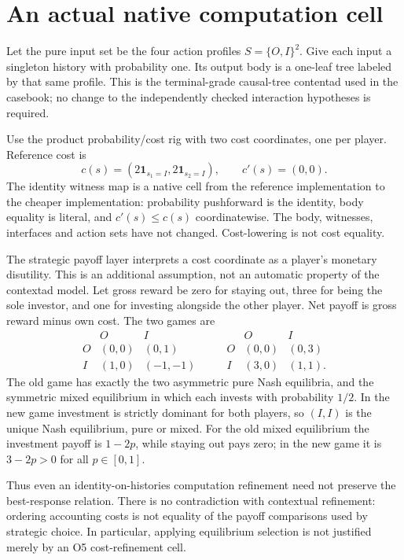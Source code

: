 \documentclass[11pt]{article}
\begin{document}
\section{An actual native computation cell}
Let the pure input set be the four action profiles
\(S=\{O,I\}^2\). Give each input a singleton history with probability one. Its output body is a one-leaf tree labeled by that same profile. This is the terminal-grade causal-tree contentad used in the casebook; no change to the independently checked interaction hypotheses is required.

Use the product probability/cost rig with two cost coordinates, one per player. Reference cost is
\[
 c(s)=(2\mathbf1_{s_1=I},2\mathbf1_{s_2=I}),
 \qquad c'(s)=(0,0).
\]
The identity witness map is a native cell from the reference implementation to the cheaper implementation: probability pushforward is the identity, body equality is literal, and \(c'(s)\leq c(s)\) coordinatewise. The body, witnesses, interfaces and action sets have not changed. Cost-lowering is not cost equality.

The strategic payoff layer interprets a cost coordinate as a player's monetary disutility. This is an additional assumption, not an automatic property of the contextad model. Let gross reward be zero for staying out, three for being the sole investor, and one for investing alongside the other player. Net payoff is gross reward minus own cost. The two games are
\[
\begin{array}{c|cc}
 &O&I\\\hline
 O&(0,0)&(0,1)\\
 I&(1,0)&(-1,-1)
\end{array}
\qquad
\begin{array}{c|cc}
 &O&I\\\hline
 O&(0,0)&(0,3)\\
 I&(3,0)&(1,1).
\end{array}
\]
The old game has exactly the two asymmetric pure Nash equilibria, and the symmetric mixed equilibrium in which each invests with probability \(1/2\). In the new game investment is strictly dominant for both players, so \((I,I)\) is the unique Nash equilibrium, pure or mixed. For the old mixed equilibrium the investment payoff is \(1-2p\), while staying out pays zero; in the new game it is \(3-2p>0\) for all \(p\in[0,1]\).

Thus even an identity-on-histories computation refinement need not preserve the best-response relation. There is no contradiction with contextual refinement: ordering accounting costs is not equality of the payoff comparisons used by strategic choice. In particular, applying equilibrium selection is not justified merely by an O5 cost-refinement cell.
\end{document}
